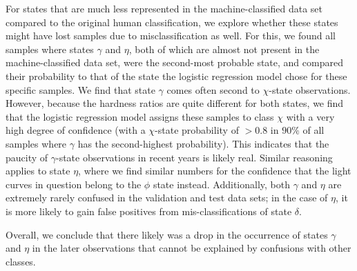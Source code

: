 \documentclass[fleqn,usenatbib]{mnras}
\begin{document}
For states that are much less represented in the machine-classified data set compared to the original human classification, we explore whether these states might have lost samples due to misclassification as well. For this, we found all samples where states $\gamma$ and $\eta$, both of which are almost not present in the 
machine-classified data set, were the second-most probable state, and compared their probability to that of the state the logistic regression model chose for these specific samples. We find that state $\gamma$ comes often second to $\chi$-state observations. However, because the hardness ratios are quite different for both states, we find that the logistic regression model assigns these samples to class $\chi$ with a very high degree of confidence (with a $\chi$-state probability of $>0.8$ in $90\%$ of all samples where $\gamma$ has the second-highest probability). This indicates that the paucity of $\gamma$-state observations in recent years is likely real. Similar reasoning applies to state $\eta$, where we find similar numbers for the confidence that the light curves in question belong to the $\phi$ state instead. Additionally, both $\gamma$ and $\eta$ are extremely rarely confused in the validation and test data sets; in the case of $\eta$, it is more likely to gain false positives from mis-classifications of state $\delta$. 

Overall, we conclude that there likely was a drop in the occurrence of states $\gamma$ and $\eta$ in the later observations that cannot be explained by confusions with other classes.
\end{document}
